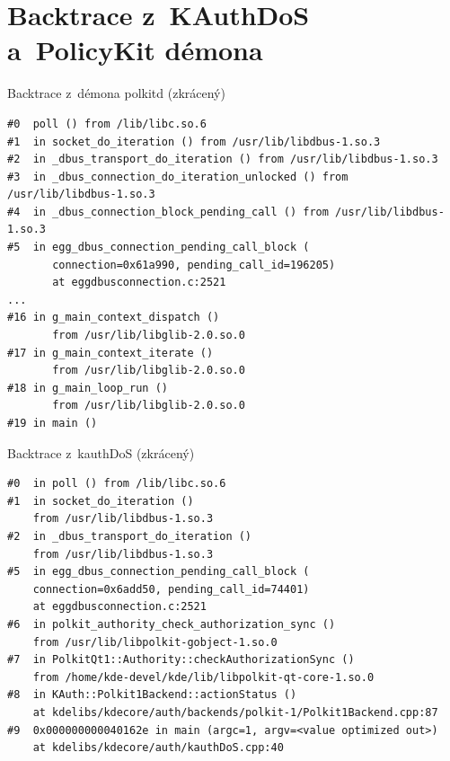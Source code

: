 \chapter{Backtrace z~KAuthDoS a~PolicyKit démona}
\lstset{basicstyle=\scriptsize\ttfamily}
\begin{mylisting}
\caption{Backtrace z~démona polkitd (zkrácený)}
\label{btrac1}
\begin{lstlisting}
#0  poll () from /lib/libc.so.6
#1  in socket_do_iteration () from /usr/lib/libdbus-1.so.3
#2  in _dbus_transport_do_iteration () from /usr/lib/libdbus-1.so.3
#3  in _dbus_connection_do_iteration_unlocked () from /usr/lib/libdbus-1.so.3
#4  in _dbus_connection_block_pending_call () from /usr/lib/libdbus-1.so.3
#5  in egg_dbus_connection_pending_call_block (
       connection=0x61a990, pending_call_id=196205)
       at eggdbusconnection.c:2521
...      
#16 in g_main_context_dispatch ()
       from /usr/lib/libglib-2.0.so.0
#17 in g_main_context_iterate ()
       from /usr/lib/libglib-2.0.so.0
#18 in g_main_loop_run ()
       from /usr/lib/libglib-2.0.so.0
#19 in main ()
\end{lstlisting}
\end{mylisting}
\begin{mylisting}
\caption{Backtrace z~kauthDoS (zkrácený)}
\label{btrac2}
\begin{lstlisting}
#0  in poll () from /lib/libc.so.6
#1  in socket_do_iteration ()
    from /usr/lib/libdbus-1.so.3
#2  in _dbus_transport_do_iteration ()
    from /usr/lib/libdbus-1.so.3
#5  in egg_dbus_connection_pending_call_block (
    connection=0x6add50, pending_call_id=74401)
    at eggdbusconnection.c:2521
#6  in polkit_authority_check_authorization_sync ()
    from /usr/lib/libpolkit-gobject-1.so.0
#7  in PolkitQt1::Authority::checkAuthorizationSync ()
    from /home/kde-devel/kde/lib/libpolkit-qt-core-1.so.0
#8  in KAuth::Polkit1Backend::actionStatus ()
    at kdelibs/kdecore/auth/backends/polkit-1/Polkit1Backend.cpp:87
#9  0x000000000040162e in main (argc=1, argv=<value optimized out>)
    at kdelibs/kdecore/auth/kauthDoS.cpp:40 
\end{lstlisting}
\end{mylisting}
